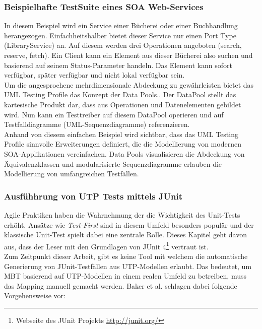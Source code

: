 \subsubsection{Beispielhafte TestSuite eines SOA Web-Services}
 In diesem Beispiel wird ein Service einer Bücherei oder einer Buchhandlung herangezogen. Einfachheitshalber bietet dieser Service nur einen Port Type (LibraryService) an. Auf diesem werden drei Operationen angeboten (search, reserve, fetch). Ein Client kann ein Element aus dieser Bücherei also suchen und basierend auf seinem Status-Parameter handeln. Das Element kann sofort verfügbar, später verfügbar und nicht lokal verfügbar sein.\\

Um die angesprochene mehrdimensionale Abdeckung zu gewährleisten bietet das UML Testing Profile das Konzept der Data Pools.. Der DataPool stellt das kartesische Produkt dar, dass aus Operationen und Datenelementen gebildet wird. Nun kann ein Testtreiber auf diesem DataPool operieren und auf Testfalldiagramme (UML-Sequenzdiagramme) referenzieren.\\
Anhand von diesem einfachen Beispiel wird sichtbar, dass das UML Testing Profile sinnvolle Erweiterungen definiert, die die Modellierung von modernen SOA-Applikationen vereinfachen. Data Pools visualisieren die Abdeckung von Äquivalenzklassen und modularisierte Sequenzdiagramme erlauben die Modellierung von umfangreichen Testfällen. 


\subsubsection{Ausfühhrung von UTP Tests mittels JUnit}
Agile Praktiken haben die Wahrnehmung der die Wichtigkeit des Unit-Tests erhöht\cite{_model-driven_2007}. Ansätze wie \textit{Test-First} sind in diesem Umfeld besonders populär und der klassische Unit-Test spielt dabei eine zentrale Rolle. Dieses Kapitel geht davon aus, dass der Leser mit den Grundlagen von JUnit 4\footnote{Webseite des JUnit Projekts \url{http://junit.org/}} vertraut ist.\\

Zum Zeitpunkt dieser Arbeit, gibt es keine Tool mit welchem die automatische Generierung von JUnit-Testfällen aus UTP-Modellen erlaubt. Das bedeutet, um MBT basierend auf UTP-Modellen in einem realen Umfeld zu betreiben, muss das Mapping manuell gemacht werden. Baker et al. schlagen dabei folgende Vorgehensweise vor\cite{_model-driven_2007}:

